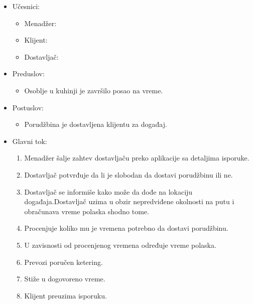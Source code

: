 \documentclass[a4paper]{article}
\begin{document}
  \begin{itemize}
        \item Učesnici:
         \begin{itemize}
        \item Menadžer:
    \end{itemize}
          \begin{itemize}
        \item Klijent:
    \end{itemize}
      \begin{itemize}
        \item Dostavljač:
    \end{itemize}
    \end{itemize}
      \begin{itemize}
        \item Preduslov:
          \begin{itemize}
        \item Osoblje u kuhinji je završilo posao na vreme.
       
   \end{itemize}
    
    \end{itemize}
      \begin{itemize}
        \item Postuslov:
          \begin{itemize}
        \item Porudžbina je dostavljena klijentu za događaj.
    \end{itemize}
    \end{itemize}
      \begin{itemize}
        \item Glavni tok:
          \begin{enumerate}
          
              \item Menadžer šalje zahtev dostavljaču preko aplikacije sa detaljima isporuke.
          
              \item Dostavljač potvrđuje da li je slobodan da dostavi porudžbinu ili ne.
              
              \item Dostavljač se informiše kako može da dođe na lokaciju događaja.Dostavljač uzima u obzir nepredviđene okolnosti na putu i obračunava vreme polaska shodno tome.
        
              \item Procenjuje koliko mu je vremena potrebno da dostavi porudžbinu.
         
              \item U zavisnosti od procenjenog vremena određuje vreme polaska.
      
              \item Prevozi poručen ketering.
         
              \item Stiže u dogovoreno vreme.
         
              \item Klijent preuzima isporuku.
          \end{enumerate}
    \end{itemize}
\end{document}
